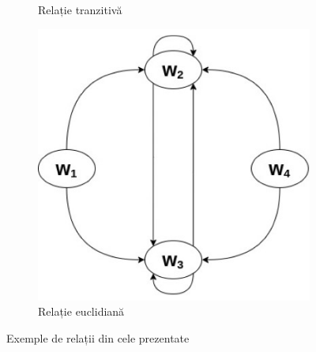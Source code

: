 \documentclass[12pt, openany]{book}
\begin{document}
\begin{figure}[h!]
\begin{subfigure}[h]{0.3\linewidth}
                    \caption{Relație tranzitivă}
                \end{subfigure}
                \hfill
                \begin{subfigure}[h]{0.3\linewidth}
                    \label{fig_euclidean}
                    \includegraphics[width=\linewidth]{images/euclidean.jpg}
                    \caption{Relație euclidiană}
                \end{subfigure}
                \caption{Exemple de relații din cele prezentate}
            \end{figure}
            \vspace{76pt}
\end{document}
